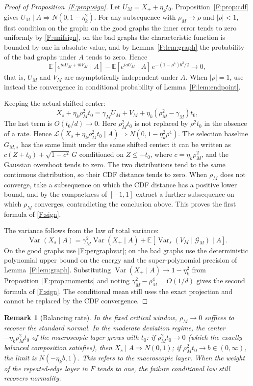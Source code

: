 \documentclass[a4paper,11pt]{article}
\newtheorem{remark}[theorem]{Remark}
\numberwithin{equation}{section}
\newcommand{\E}{\mathbb E}
\newcommand{\Var}{\operatorname{Var}}
\begin{document}
\begin{proof}[Proof of Proposition~\ref{F:prop:sign}]
Let $U_M=X_++\eta_kt_0$. Proposition~\ref{F:prop:cdf} gives $U_M\mid A\Rightarrow N(0,1-\eta_k^2)$. For any
subsequence with $\rho_M\to\rho$ and $|\rho|<1$, first condition on the graph: on the good graphs the inner
error tends to zero uniformly by \eqref{F:unifsign}, on the bad graphs the characteristic function is bounded
by one in absolute value, and by Lemma~\ref{F:lem:graph} the probability of the bad graphs under $A$ tends to
zero. Hence
\[
\E[e^{iaU_M+ibV_M}\mid A]-\E[e^{iaU_M}\mid A]\,e^{-(1-\rho^4)b^2/2}\to0,
\]
that is, $U_M$ and $V_M$ are asymptotically independent under $A$. When $|\rho|=1$, use instead the convergence
in conditional probability of Lemma~\ref{F:lem:endpoint}.

Keeping the actual shifted center:
\[
X_s+\eta_k\rho_M^2t_0=\gamma_MU_M+V_M+\eta_k(\rho_M^2-\gamma_M)t_0,
\]
The last term is $O(t_0/d)\to0$. Here $\rho_M^2t_0$ is not replaced by $\rho^2t_0$ in the absence of a rate.
Hence $\mathcal L(X_s+\eta_k\rho_M^2t_0\mid A)\Rightarrow N(0,1-\eta_k^2\rho^4)$. The selection baseline
$G_{M,s}$ has the same limit under the same shifted center: it can be written as
$c(Z+t_0)+\sqrt{1-c^2}\,G$ conditioned on $Z\le-t_0$, where $c=\eta_k\rho_M^2$, and the Gaussian overshoot
tends to zero. The two distributions tend to the same continuous distribution, so their CDF distance tends to
zero. When $\rho_M$ does not converge, take a subsequence on which the CDF distance has a positive lower bound,
and by the compactness of $[-1,1]$ extract a further subsequence on which $\rho_M$ converges, contradicting the
conclusion above. This proves the first formula of \eqref{F:sign}.

The variance follows from the law of total variance:
\[
\Var(X_s\mid A)=\gamma_M^2\Var(X_+\mid A)+\E[\Var_s(V_M\mid\mathcal G_M)\mid A].
\]
On the good graphs use \eqref{F:pergraphvar}; on the bad graphs use the deterministic polynomial upper bound on
the energy and the super-polynomial precision of Lemma~\ref{F:lem:graph}. Substituting
$\Var(X_+\mid A)\to1-\eta_k^2$ from Proposition~\ref{F:prop:moments} and noting
$\gamma_M^2-\rho_M^4=O(1/d)$ gives the second formula of \eqref{F:sign}. The conditional mean still uses the
exact projection and cannot be replaced by the CDF convergence.
\end{proof}

\begin{remark}[Balancing rate]
In the fixed critical window, $\rho_M\to0$ suffices to recover the standard normal. In the moderate deviation
regime, the center $-\eta_k\rho_M^2t_0$ of the macroscopic layer grows with $t_0$: if $\rho_M^2t_0\to0$ (which
the exactly balanced composition satisfies), then $X_s\mid A\Rightarrow N(0,1)$; if $\rho_M^2t_0\to
b\in(0,\infty)$, the limit is $N(-\eta_kb,1)$. This refers to the macroscopic layer. When the weight of the
repeated-edge layer in $F$ tends to one, the failure conditional law still recovers normality.
\end{remark}
\end{document}
